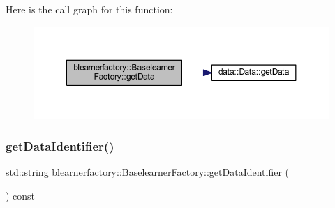Here is the call graph for this function\+:\nopagebreak
\begin{figure}[H]
\begin{center}
\leavevmode
\includegraphics[width=350pt]{classblearnerfactory_1_1_baselearner_factory_ad9da09739f04e5c8bd268551251801be_cgraph}
\end{center}
\end{figure}
\mbox{\label{classblearnerfactory_1_1_baselearner_factory_a40703963bb3fd273b835a99263d9b599}} 
\subsubsection{\texorpdfstring{get\+Data\+Identifier()}{getDataIdentifier()}}
{\footnotesize\ttfamily std\+::string blearnerfactory\+::\+Baselearner\+Factory\+::get\+Data\+Identifier (\begin{DoxyParamCaption}{ }\end{DoxyParamCaption}) const}


